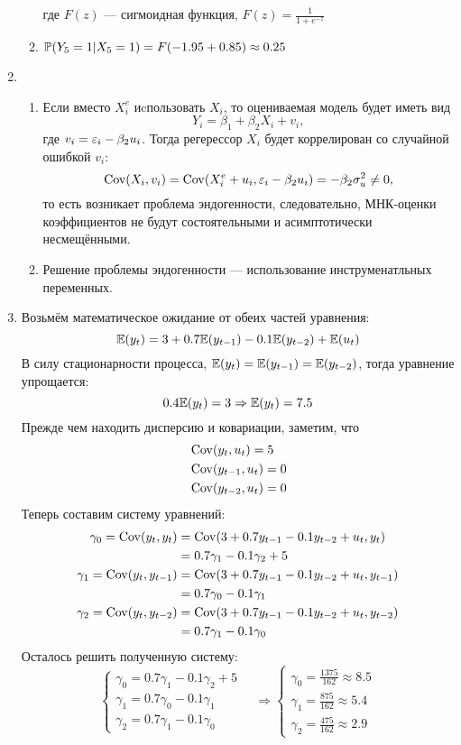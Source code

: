 \documentclass[12pt, a4paper]{article}
\theoremstyle{definition}
\begin{document}
\begin{enumerate}
\begin{enumerate}
\[\]
где $F(z)$ — сигмоидная функция, $F(z) = \frac{1}{1 + e^{-z}}$
\item $\P(Y_5 = 1 | X_5 = 1) = F(-1.95 + 0.85) \approx 0.25$
\end{enumerate}
\item
\begin{enumerate}
\item Если вместо $X^e_i$ иcпользовать $X_i$, то оцениваемая модель будет иметь вид
\[
Y_i = \beta_1 + \beta_2 X_i + v_i,
\]
где $v_i = \e_i - \beta_2 u_i$.
Тогда регерессор $X_i$ будет коррелирован со случайной ошибкой $v_i$:
\[
\Cov(X_i, v_i) = \Cov(X^e_i + u_i, \e_i - \beta_2 u_i) = -\beta_2 \sigma^2_u \neq 0,
\]
то есть возникает проблема эндогенности, следовательно, МНК-оценки коэффициентов
не будут состоятельными и асимптотически несмещёнными.
\item Решение проблемы эндогенности — использование инструменатльных переменных.
\end{enumerate}
\item Возьмём математическое ожидание от обеих частей уравнения:
\[
\E(y_t) = 3 + 0.7 \E(y_{t-1}) - 0.1 \E(y_{t-2}) + \E(u_t)
\]
В силу стационарности процесса, $\E(y_t) = \E(y_{t-1}) = \E(y_{t-2})$,
тогда уравнение упрощается:
\[
0.4 \E(y_t) = 3 \Rightarrow \E(y_t) = 7.5
\]
Прежде чем находить дисперсию и ковариации, заметим, что
\begin{align*}
& \Cov(y_t, u_t) = 5 \\
& \Cov(y_{t-1}, u_t) = 0 \\
& \Cov(y_{t-2}, u_t) = 0
\end{align*}
Теперь составим систему уравнений:
\begin{align*}
\gamma_0 = \Cov(y_t, y_t) &= \Cov(3 + 0.7 y_{t-1} - 0.1 y_{t-2} + u_t, y_t) \\
&= 0.7 \gamma_1 - 0.1 \gamma_2 + 5 \\
\gamma_1 = \Cov(y_t, y_{t-1}) &= \Cov(3 + 0.7 y_{t-1} - 0.1 y_{t-2} + u_t, y_{t-1}) \\
&= 0.7 \gamma_0 - 0.1 \gamma_1 \\
\gamma_2 = \Cov(y_t, y_{t-2}) &= \Cov(3 + 0.7 y_{t-1} - 0.1 y_{t-2} + u_t, y_{t-2}) \\
&= 0.7 \gamma_1 - 0.1 \gamma_0
\end{align*}
Осталось решить полученную систему:
\[
\begin{cases}
\gamma_0 = 0.7 \gamma_1 - 0.1 \gamma_2 + 5 \\
\gamma_1 = 0.7 \gamma_0 - 0.1 \gamma_1 \\
\gamma_2 = 0.7 \gamma_1 - 0.1 \gamma_0
\end{cases}
\quad \Rightarrow
\begin{cases}
\gamma_0 = \frac{1375}{162} \approx 8.5 \\
\gamma_1 = \frac{875}{162} \approx 5.4 \\
\gamma_2 = \frac{475}{162} \approx 2.9
\end{cases}
\]
\end{enumerate}
\end{document}
